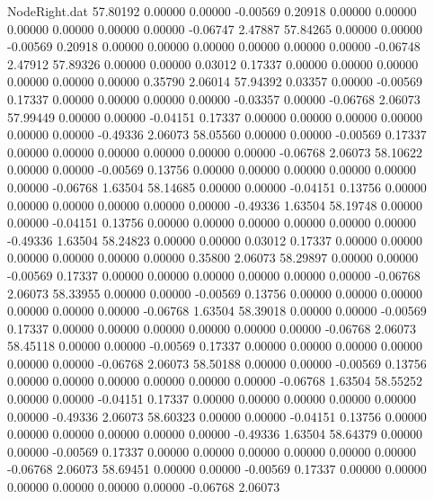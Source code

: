 \begin{filecontents}{NodeRight.dat}
  57.80192    0.00000    0.00000    -0.00569    0.20918    0.00000    0.00000    0.00000    0.00000    0.00000    0.00000   -0.06747    2.47887
  57.84265    0.00000    0.00000    -0.00569    0.20918    0.00000    0.00000    0.00000    0.00000    0.00000    0.00000   -0.06748    2.47912
  57.89326    0.00000    0.00000     0.03012    0.17337    0.00000    0.00000    0.00000    0.00000    0.00000    0.00000    0.35790    2.06014
  57.94392    0.03357    0.00000    -0.00569    0.17337    0.00000    0.00000    0.00000    0.00000   -0.03357    0.00000   -0.06768    2.06073
  57.99449    0.00000    0.00000    -0.04151    0.17337    0.00000    0.00000    0.00000    0.00000    0.00000    0.00000   -0.49336    2.06073
  58.05560    0.00000    0.00000    -0.00569    0.17337    0.00000    0.00000    0.00000    0.00000    0.00000    0.00000   -0.06768    2.06073
  58.10622    0.00000    0.00000    -0.00569    0.13756    0.00000    0.00000    0.00000    0.00000    0.00000    0.00000   -0.06768    1.63504
  58.14685    0.00000    0.00000    -0.04151    0.13756    0.00000    0.00000    0.00000    0.00000    0.00000    0.00000   -0.49336    1.63504
  58.19748    0.00000    0.00000    -0.04151    0.13756    0.00000    0.00000    0.00000    0.00000    0.00000    0.00000   -0.49336    1.63504
  58.24823    0.00000    0.00000     0.03012    0.17337    0.00000    0.00000    0.00000    0.00000    0.00000    0.00000    0.35800    2.06073
  58.29897    0.00000    0.00000    -0.00569    0.17337    0.00000    0.00000    0.00000    0.00000    0.00000    0.00000   -0.06768    2.06073
  58.33955    0.00000    0.00000    -0.00569    0.13756    0.00000    0.00000    0.00000    0.00000    0.00000    0.00000   -0.06768    1.63504
  58.39018    0.00000    0.00000    -0.00569    0.17337    0.00000    0.00000    0.00000    0.00000    0.00000    0.00000   -0.06768    2.06073
  58.45118    0.00000    0.00000    -0.00569    0.17337    0.00000    0.00000    0.00000    0.00000    0.00000    0.00000   -0.06768    2.06073
  58.50188    0.00000    0.00000    -0.00569    0.13756    0.00000    0.00000    0.00000    0.00000    0.00000    0.00000   -0.06768    1.63504
  58.55252    0.00000    0.00000    -0.04151    0.17337    0.00000    0.00000    0.00000    0.00000    0.00000    0.00000   -0.49336    2.06073
  58.60323    0.00000    0.00000    -0.04151    0.13756    0.00000    0.00000    0.00000    0.00000    0.00000    0.00000   -0.49336    1.63504
  58.64379    0.00000    0.00000    -0.00569    0.17337    0.00000    0.00000    0.00000    0.00000    0.00000    0.00000   -0.06768    2.06073
  58.69451    0.00000    0.00000    -0.00569    0.17337    0.00000    0.00000    0.00000    0.00000    0.00000    0.00000   -0.06768    2.06073

\end{filecontents}
